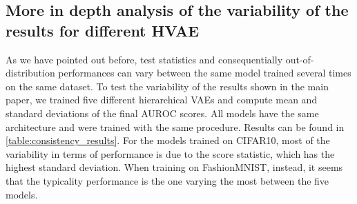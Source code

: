 {\subsection{More in depth analysis of the variability of the results for different HVAE}
As we have pointed out before, test statistics and consequentially out-of-distribution performances can vary between the same model trained several times on the same dataset. To test the variability of the results shown in the main paper, we trained five different hierarchical VAEs and compute mean and standard deviations of the final AUROC scores. All models have the same architecture and were trained with the same procedure. Results can be found in \cref{table:consistency_results}. For the models trained on CIFAR10, most of the variability in terms of performance is due to the score statistic, which has the highest standard deviation. When training on FashionMNIST, instead, it seems that the typicality performance is the one varying the most between the five models.

}
